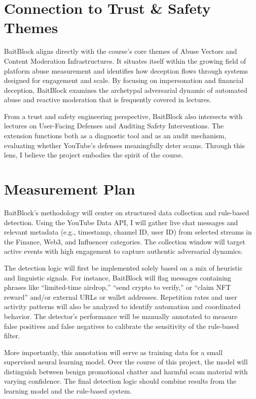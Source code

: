 \documentclass[letterpaper,twocolumn,10pt]{article}
\begin{document}
\section{Connection to Trust & Safety Themes}

BaitBlock aligns directly with the course’s core themes of Abuse Vectors and Content Moderation Infrastructures. It situates itself within the growing field of platform abuse measurement and identifies how deception flows through systems designed for engagement and scale. By focusing on impersonation and financial deception, BaitBlock examines the archetypal adversarial dynamic of automated abuse and reactive moderation that is frequently covered in lectures. 

From a trust and safety engineering perspective, BaitBlock also intersects with lectures on User-Facing Defenses and Auditing Safety Interventions. The extension functions both as a diagnostic tool and as an audit mechanism, evaluating whether YouTube’s defenses meaningfully deter scams. Through this lens, I believe the project embodies the spirit of the course.

\section{Measurement Plan}

BaitBlock’s methodology will center on structured data collection and rule-based detection. Using the YouTube Data API, I will gather live chat messages and relevant metadata (e.g., timestamp, channel ID, user ID) from selected streams in the Finance, Web3, and Influencer categories. The collection window will target active events with high engagement to capture authentic adversarial dynamics.

The detection logic will first be implemented solely based on a mix of heuristic and linguistic signals. For instance, BaitBlock will flag messages containing phrases like “limited-time airdrop,” “send crypto to verify,” or “claim NFT reward” and/or external URLs or wallet addresses. Repetition rates and user activity patterns will also be analyzed to identify automation and coordinated behavior. The detector’s performance will be manually annotated to measure false positives and false negatives to calibrate the sensitivity of the rule-based filter. 

More importantly, this annotation will serve as training data for a small supervised neural learning model. Over the course of this project, the model will distinguish between benign promotional chatter and harmful scam material with varying confidence. The final detection logic should combine results from the learning model and the rule-based system.
\end{document}
